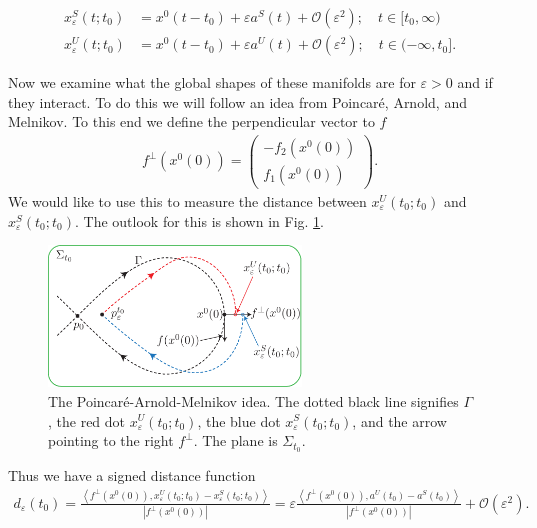 \begin{subequations}
\begin{align}
	x_{\varepsilon}^{S}(t;t_0) &= x^{0}(t-t_0) + \varepsilon a^{S}(t) + \mathcal{O}(\varepsilon^{2} );\quad t\in [t_0,\infty ) \\
	x_{\varepsilon}^{U}(t;t_0) &= x^{0}(t-t_0) + \varepsilon a^{U}(t) + \mathcal{O}(\varepsilon^{2} );\quad t\in (-\infty, t_0].
\end{align}
\end{subequations}

Now we examine what the global shapes of these manifolds are for $\varepsilon>0$ and if they interact. To do this we will follow an idea from Poincaré, Arnold, and Melnikov. To this end we define the perpendicular vector to $f$ 
\begin{align}
	f^{\perp}(x^{0}(0)) = 
	\begin{pmatrix}
		-f_2(x^{0}(0)) \\ f_1 (x^{0}(0))
	\end{pmatrix}
	.
\end{align}
We would like to use this to measure the distance between $x^{U}_{\varepsilon}(t_0;t_0)$ and $x^{S}_{\varepsilon}(t_0;t_0)$. The outlook for this is shown in Fig. \ref{fig:PAM_idea}.
\begin{figure}[h!]
	\centering
	\includegraphics[width=0.6\textwidth]{figures/ch6/10PAM_idea.pdf}
	\caption{The Poincaré-Arnold-Melnikov idea. The dotted black line signifies $\Gamma$, the red dot $x^{U}_{\varepsilon}(t_0;t_0)$, the blue dot $x^{S}_{\varepsilon}(t_0;t_0)$, and the arrow pointing to the right $f^{\perp}$. The plane is $\Sigma_{t_0}$.}
	\label{fig:PAM_idea}
\end{figure}
Thus we have a signed distance function
\begin{align}
	d_{\varepsilon}(t_0) = \frac{\left\langle f^{\perp}(x^{0}(0)), x^{U}_{\varepsilon}(t_0; t_0) - x^{S}_{\varepsilon}(t_0; t_0)\right\rangle}{\left| f^{\perp}(x^{0}(0))\right|} 
	= \varepsilon  \frac{\left\langle f^{\perp}(x^{0}(0)), a^{U}(t_0) - a^{S}(t_0) \right\rangle}{\left| f^{\perp}(x^{0}(0))\right|} + \mathcal{O}(\varepsilon^2).
\end{align}
